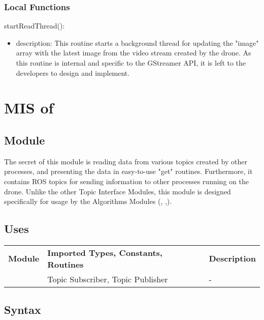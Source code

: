 \documentclass[12pt, titlepage]{article}
\begin{document}
\subsubsection{Local Functions}
\noindent startReadThread():
\begin{itemize}
\item description: This routine starts a background thread for updating the "image" array with the latest image from the video stream created by the drone. As this routine is internal and specific to the GStreamer API, it is left to the developers to design and implement. 
\end{itemize}
\newpage






\section{MIS of } \label{MIS_ALGO_TI} 
\subsection{Module}
The secret of this module is reading data from various topics created by other processes, and presenting the data in easy-to-use "get" routines. Furthermore, it contains ROS topics for sending information to other processes running on the drone. Unlike the other Topic Interface Modules, this module is designed specifically for usage by the Algorithms Modules (, ,).
\subsection{Uses}
\begin{center}
\begin{tabular}{p{2 cm} p{5cm} p{6.5cm} } 
\hline
\textbf{Module} & \textbf{Imported Types, Constants, Routines} & \textbf{Description} \\
\nameref{ROS} & Topic Subscriber, Topic Publisher & - \\
\hline
\hline
\end{tabular}
\end{center}
\subsection{Syntax}
\end{document}
